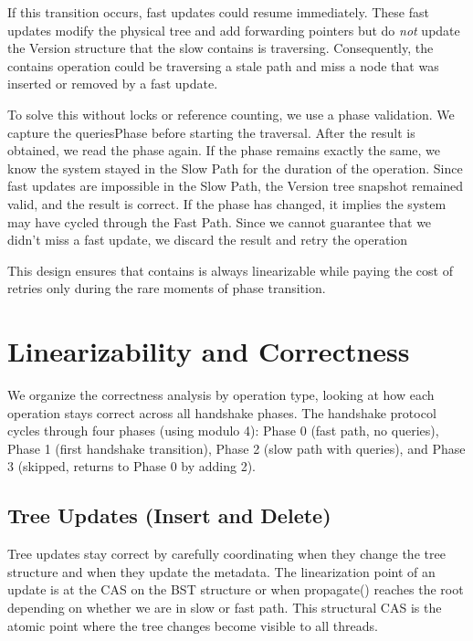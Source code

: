\documentclass[acmsmall,screen,nonacm]{acmart}
\newcommand{\codestyle}[1]{{{\fontsize{9}{10}\ttfamily #1}}}
\begin{document}
If this transition occurs, fast updates could resume immediately. These fast updates modify the physical tree and add forwarding pointers but do \textit{not} update the \codestyle{Version} structure that the slow \codestyle{contains} is traversing. Consequently, the \codestyle{contains} operation could be traversing a stale path and miss a node that was inserted or removed by a fast update.

To solve this without locks or reference counting, we use a phase validation. We capture the \codestyle{queriesPhase} before starting the traversal. After the result is obtained, we read the phase again. If the phase remains exactly the same, we know the system stayed in the Slow Path for the duration of the operation. Since fast updates are impossible in the Slow Path, the \codestyle{Version} tree snapshot remained valid, and the result is correct. If the phase has changed, it implies the system may have cycled through the Fast Path. Since we cannot guarantee that we didn't miss a fast update, we discard the result and retry the operation


This design ensures that \codestyle{contains} is always linearizable while paying the cost of retries only during the rare moments of phase transition.




\section{Linearizability and Correctness}

We organize the correctness analysis by operation type, looking at how each operation stays correct across all handshake phases. The handshake protocol cycles through four phases (using modulo 4): Phase 0 (fast path, no queries), Phase 1 (first handshake transition), Phase 2 (slow path with queries), and Phase 3 (skipped, returns to Phase 0 by adding 2).

\subsection{Tree Updates (Insert and Delete)}

Tree updates stay correct by carefully coordinating when they change the tree structure and when they update the metadata. The linearization point of an update is at the CAS on the BST structure or when \codestyle{propagate()} reaches the root depending on whether we are in slow or fast path. This structural CAS is the atomic point where the tree changes become visible to all threads.
\end{document}
